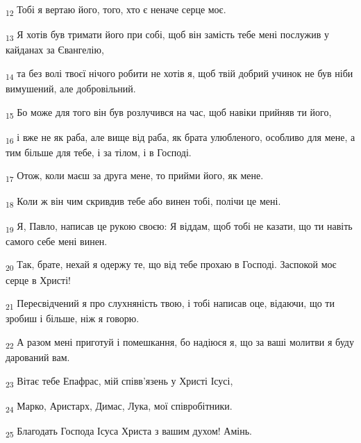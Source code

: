 \begin{tcolorbox}
\textsubscript{12} Тобі я вертаю його, того, хто є неначе серце моє.
\end{tcolorbox}
\begin{tcolorbox}
\textsubscript{13} Я хотів був тримати його при собі, щоб він замість тебе мені послужив у кайданах за Євангелію,
\end{tcolorbox}
\begin{tcolorbox}
\textsubscript{14} та без волі твоєї нічого робити не хотів я, щоб твій добрий учинок не був ніби вимушений, але добровільний.
\end{tcolorbox}
\begin{tcolorbox}
\textsubscript{15} Бо може для того він був розлучився на час, щоб навіки прийняв ти його,
\end{tcolorbox}
\begin{tcolorbox}
\textsubscript{16} і вже не як раба, але вище від раба, як брата улюбленого, особливо для мене, а тим більше для тебе, і за тілом, і в Господі.
\end{tcolorbox}
\begin{tcolorbox}
\textsubscript{17} Отож, коли маєш за друга мене, то прийми його, як мене.
\end{tcolorbox}
\begin{tcolorbox}
\textsubscript{18} Коли ж він чим скривдив тебе або винен тобі, полічи це мені.
\end{tcolorbox}
\begin{tcolorbox}
\textsubscript{19} Я, Павло, написав це рукою своєю: Я віддам, щоб тобі не казати, що ти навіть самого себе мені винен.
\end{tcolorbox}
\begin{tcolorbox}
\textsubscript{20} Так, брате, нехай я одержу те, що від тебе прохаю в Господі. Заспокой моє серце в Христі!
\end{tcolorbox}
\begin{tcolorbox}
\textsubscript{21} Пересвідчений я про слухняність твою, і тобі написав оце, відаючи, що ти зробиш і більше, ніж я говорю.
\end{tcolorbox}
\begin{tcolorbox}
\textsubscript{22} А разом мені приготуй і помешкання, бо надіюся я, що за ваші молитви я буду дарований вам.
\end{tcolorbox}
\begin{tcolorbox}
\textsubscript{23} Вітає тебе Епафрас, мій співв'язень у Христі Ісусі,
\end{tcolorbox}
\begin{tcolorbox}
\textsubscript{24} Марко, Аристарх, Димас, Лука, мої співробітники.
\end{tcolorbox}
\begin{tcolorbox}
\textsubscript{25} Благодать Господа Ісуса Христа з вашим духом! Амінь.
\end{tcolorbox}

